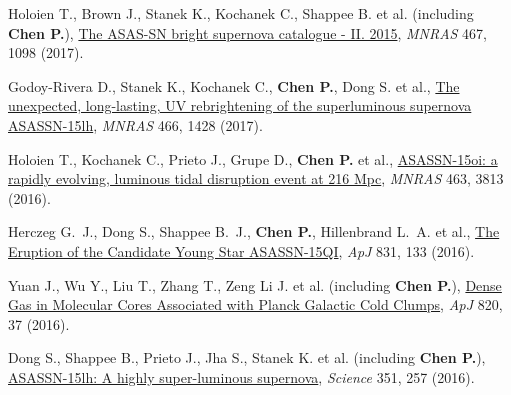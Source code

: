 \item Holoien T., Brown J., Stanek K., Kochanek C., Shappee B. et al. (including \textbf{Chen P.}), \href{https://ui.adsabs.harvard.edu/abs/2017MNRAS.467.1098H}{The ASAS-SN bright supernova catalogue - II. 2015}, \textit{MNRAS} 467, 1098 (2017).

\item Godoy-Rivera D., Stanek K., Kochanek C., \textbf{Chen P.}, Dong S. et al., \href{https://ui.adsabs.harvard.edu/abs/2017MNRAS.466.1428G}{The unexpected, long-lasting, UV rebrightening of the superluminous supernova ASASSN-15lh}, \textit{MNRAS} 466, 1428 (2017).

\item Holoien T., Kochanek C., Prieto J., Grupe D., \textbf{Chen P.} et al., \href{https://ui.adsabs.harvard.edu/abs/2016MNRAS.463.3813H}{ASASSN-15oi: a rapidly evolving, luminous tidal disruption event at 216 Mpc}, \textit{MNRAS} 463, 3813 (2016).

\item Herczeg G.~J., Dong S., Shappee B.~J., \textbf{Chen P.}, Hillenbrand L.~A. et al., \href{https://ui.adsabs.harvard.edu/abs/2016ApJ...831..133H}{The Eruption of the Candidate Young Star ASASSN-15QI}, \textit{ApJ} 831, 133 (2016).

\item Yuan J., Wu Y., Liu T., Zhang T., Zeng Li J. et al. (including \textbf{Chen P.}), \href{https://ui.adsabs.harvard.edu/abs/2016ApJ...820...37Y}{Dense Gas in Molecular Cores Associated with Planck Galactic Cold Clumps}, \textit{ApJ} 820, 37 (2016).

\item Dong S., Shappee B., Prieto J., Jha S., Stanek K. et al. (including \textbf{Chen P.}), \href{https://ui.adsabs.harvard.edu/abs/2016Sci...351..257D}{ASASSN-15lh: A highly super-luminous supernova}, \textit{Science} 351, 257 (2016).
